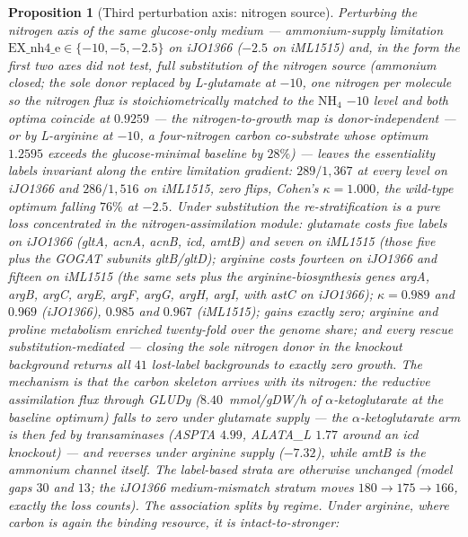 \documentclass[11pt,a4paper]{article}
\theoremstyle{plain}
\newtheorem{proposition}[theorem]{Proposition}
\theoremstyle{definition}
\theoremstyle{remark}
\begin{document}
\begin{proposition}[Third perturbation axis: nitrogen source]
\label{prop:keio-n-source}
Perturbing the nitrogen axis of the same glucose-only medium ---
ammonium-supply limitation $\mathrm{EX\_nh4\_e}\in\{-10,-5,-2.5\}$
on iJO1366 ($-2.5$ on iML1515) and, in the form the first two axes
did not test, full substitution of the nitrogen source (ammonium
closed; the sole donor replaced by L-glutamate at $-10$, one
nitrogen per molecule so the nitrogen flux is stoichiometrically
matched to the $\mathrm{NH}_4$ $-10$ level and both optima coincide
at $0.9259$ --- the nitrogen-to-growth map is donor-independent ---
or by L-arginine at $-10$, a four-nitrogen carbon co-substrate
whose optimum $1.2595$ exceeds the glucose-minimal baseline by
$28\%$) --- leaves the essentiality labels invariant along the
entire limitation gradient: $289/1{,}367$ at every level on iJO1366
and $286/1{,}516$ on iML1515, zero flips, Cohen's $\kappa=1.000$,
the wild-type optimum falling $76\%$ at $-2.5$. Under substitution
the re-stratification is a pure loss concentrated in the
nitrogen-assimilation module: glutamate costs five labels on iJO1366
(\emph{gltA}, \emph{acnA}, \emph{acnB}, \emph{icd}, \emph{amtB})
and seven on iML1515 (those five plus the GOGAT subunits
\emph{gltB}/\emph{gltD}); arginine costs fourteen on iJO1366 and
fifteen on iML1515 (the same sets plus the arginine-biosynthesis
genes \emph{argA}, \emph{argB}, \emph{argC}, \emph{argE},
\emph{argF}, \emph{argG}, \emph{argH}, \emph{argI}, with
\emph{astC} on iJO1366); $\kappa=0.989$ and $0.969$ (iJO1366),
$0.985$ and $0.967$ (iML1515); gains exactly zero; arginine and
proline metabolism enriched twenty-fold over the genome share; and
every rescue substitution-mediated --- closing the sole nitrogen
donor in the knockout background returns all $41$ lost-label
backgrounds to exactly zero growth. The mechanism is that the
carbon skeleton arrives with its nitrogen: the reductive
assimilation flux through GLUDy ($8.40$~mmol/gDW/h of
$\alpha$-ketoglutarate at the baseline optimum) falls to zero under
glutamate supply --- the $\alpha$-ketoglutarate arm is then fed by
transaminases (ASPTA $4.99$, ALATA\_L $1.77$ around an \emph{icd}
knockout) --- and reverses under arginine supply ($-7.32$), while
\emph{amtB} is the ammonium channel itself. The label-based strata
are otherwise unchanged (model gaps $30$ and $13$; the iJO1366
medium-mismatch stratum moves $180\to175\to166$, exactly the loss
counts). The association splits by regime. Under arginine, where
carbon is again the binding resource, it is intact-to-stronger:

\end{proposition}
\end{document}
